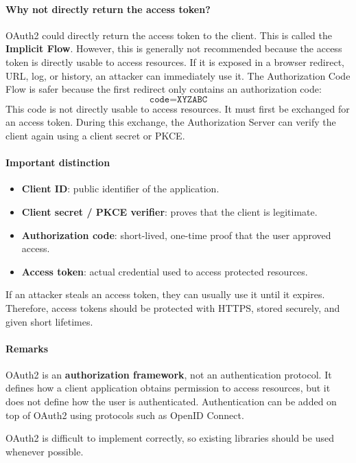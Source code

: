 \paragraph{Why not directly return the access token?} OAuth2 could directly return the access token to the client. This is called the \textbf{Implicit Flow}. However, this is generally not recommended because the access token is directly usable to access resources. If it is exposed in a browser redirect, URL, log, or history, an attacker can immediately use it. The Authorization Code Flow is safer because the first redirect only contains an authorization code: \[ \texttt{code=XYZABC} \] This code is not directly usable to access resources. It must first be exchanged for an access token. During this exchange, the Authorization Server can verify the client again using a client secret or PKCE. 


\paragraph{Important distinction} 
\begin{itemize} 
    \item \textbf{Client ID}: public identifier of the application. 
    \item \textbf{Client secret / PKCE verifier}: proves that the client is legitimate.
    
    \item \textbf{Authorization code}: short-lived, one-time proof that the user approved access. 
    
    \item \textbf{Access token}: actual credential used to access protected resources. 

\end{itemize}

If an attacker steals an access token, they can usually use it until it expires. Therefore, access tokens should be protected with HTTPS, stored securely, and given short lifetimes. 

\paragraph{Remarks} OAuth2 is an \textbf{authorization framework}, not an authentication protocol. It defines how a client application obtains permission to access resources, but it does not define how the user is authenticated. Authentication can be added on top of OAuth2 using protocols such as OpenID Connect. 

OAuth2 is difficult to implement correctly, so existing libraries should be used whenever possible.